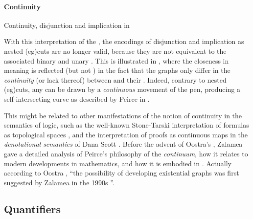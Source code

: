 \begin{scope}
\paragraph{Continuity}

\begin{marginfigure}
  
  \caption{Continuity, disjunction and implication in }
\end{marginfigure}

With this interpretation of the , the  encodings of
disjunction and implication as nested \kl(eg){cuts} are no longer valid, because
they are not  equivalent to the associated binary and
unary . This is illustrated in ,
where the closeness in meaning is reflected  (but not
) in the fact that the graphs only differ in the
\emph{continuity} (or lack thereof) between  and their . Indeed,
contrary to nested \kl(eg){cuts}, any  can be drawn by a
\emph{continuous} movement of the pen, producing a self-intersecting curve as
described by Peirce in \cite{peirce_prolegomena_1906}.

This might be related to other manifestations of the notion of continuity in the
semantics of  logic, such as the well-known Stone-Tarski
interpretation of formulas as topological spaces \cite{stone_topological_1938},
and the interpretation of proofs as continuous maps in the \emph{denotational
semantics} of Dana Scott . Before the advent of
Oostra's , Zalamea gave a detailed analysis of Peirce's philosophy of
the \emph{continuum}, how it relates to modern developments in mathematics, and
how it is embodied in  \cite{zalamea_peirces_2003}.
Actually according to Oostra , ``the
possibility of developing  existential graphs was first
suggested by Zalamea in the 1990s \cite{zalamea_ieg_1,zalamea_ieg_2}''.

\subsection{Quantifiers}


\end{scope}
